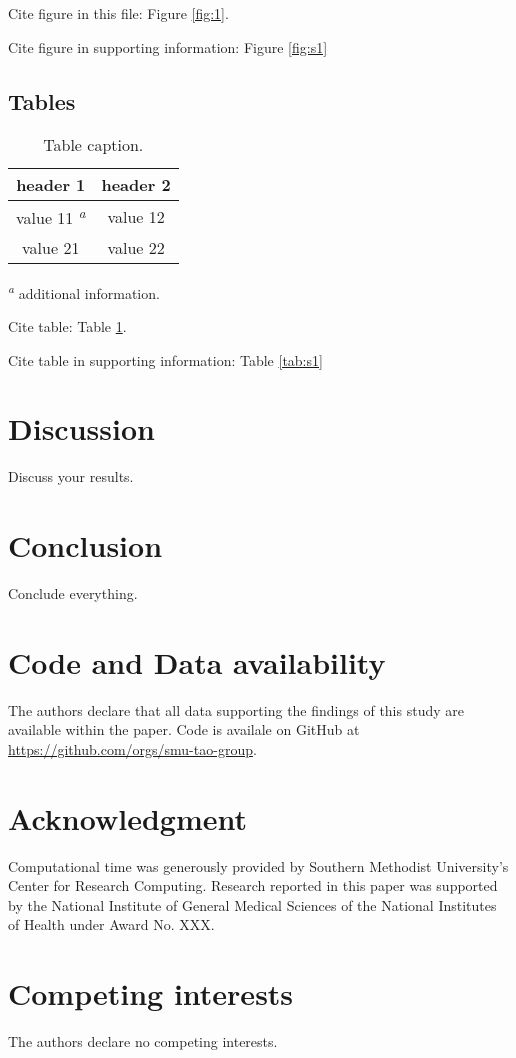 \documentclass[journal=jctcce]{achemso}
\begin{document}
Cite figure in this file: Figure \ref{fig:1}. 

Cite figure in supporting information: Figure \ref{fig:s1}

\subsection{Tables}

\begin{table}[t]
\caption{Table caption.}
\begin{tabular}{c c}
\hline
 header 1 & header 2\\
\hline
 value 11 \textsuperscript{\emph{a}} & value 12\\
 value 21 & value 22\\
\hline
\end{tabular}
\label{tab:1}

\textsuperscript{\emph{a}} additional information. 
\end{table}

Cite table: Table \ref{tab:1}. 

Cite table in supporting information: Table \ref{tab:s1}

\section{Discussion}

Discuss your results. 

\section{Conclusion}

Conclude everything. 

\section*{Code and Data availability}
The authors declare that all data supporting the findings of this study are available within the paper. Code is availale on GitHub at \url{https://github.com/orgs/smu-tao-group}. 



\section*{Acknowledgment}
Computational time was generously provided by Southern Methodist University's Center for Research Computing. Research reported in this paper was supported by the National Institute of General Medical Sciences of the National Institutes of Health under Award No. XXX.

\section*{Competing interests}
The authors declare no competing interests.
\end{document}
